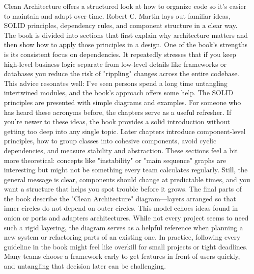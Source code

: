 \documentclass[../Main.tex]{subfiles}
\begin{document}
Clean Architecture offers a structured look at how to organize code so it's easier to maintain and adapt over time.
Robert C. Martin lays out familiar ideas, SOLID principles, dependency rules, and component structure in a clear way.
The book is divided into sections that first explain why architecture matters and then show how to apply those principles in a design.
\linebreak
\linebreak
One of the book's strengths is its consistent focus on dependencies.
It repeatedly stresses that if you keep high-level business logic separate from low-level details like frameworks or databases
you reduce the risk of "rippling" changes across the entire codebase.
This advice resonates well: I've seen persons spend a long time untangling intertwined modules, and the book's approach offers some help.
\linebreak
\linebreak
The SOLID principles are presented with simple diagrams and examples.
For someone who has heard these acronyms before, the chapters serve as a useful refresher. If you're newer to these ideas, the book provides a solid introduction without getting too deep into any single topic.
\linebreak
\linebreak
Later chapters introduce component-level principles, how to group classes into cohesive components, avoid cyclic dependencies, and measure stability and abstraction.
These sections feel a bit more theoretical: concepts like "instability" or "main sequence" graphs are interesting but might not be something every team calculates regularly.
Still, the general message is clear, components should change at predictable times, and you want a structure that helps you spot trouble before it grows.
\linebreak
\linebreak
The final parts of the book describe the "Clean Architecture" diagram—layers arranged so that inner circles do not depend on outer circles.
This model echoes ideas found in onion or ports and adapters architectures.
While not every project seems to need such a rigid layering, the diagram serves as a helpful reference when planning a new system or refactoring parts of an existing one.
\linebreak
\linebreak
In practice, following every guideline in the book might feel like overkill for small projects or tight deadlines.
Many teams choose a framework early to get features in front of users quickly, and untangling that decision later can be challenging.
\end{document}
